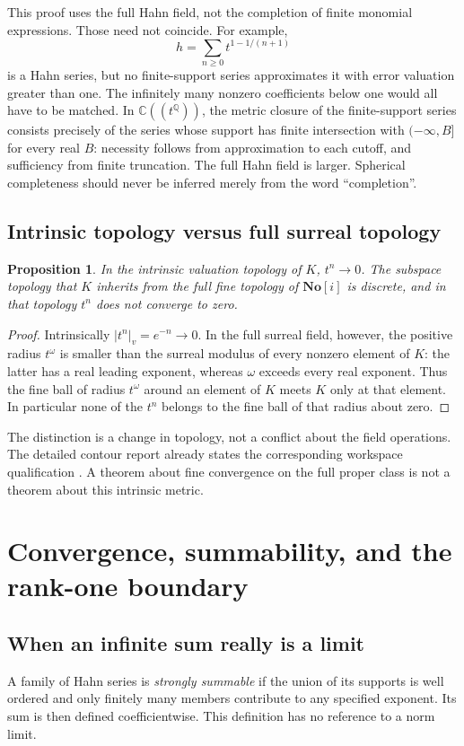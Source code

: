 \documentclass[11pt,a4paper]{article}
\numberwithin{equation}{section}
\newtheorem{proposition}[theorem]{Proposition}
\theoremstyle{definition}
\theoremstyle{remark}
\newcommand{\No}{\mathbf{No}}
\newcommand{\C}{\mathbb C}
\newcommand{\Q}{\mathbb Q}
\newcommand{\vabs}[1]{\lvert#1\rvert_v}
\begin{document}
This proof uses the full Hahn field, not the completion of finite monomial
expressions. Those need not coincide. For example,
\[
 h=\sum_{n\ge0}t^{1-1/(n+1)}
\]
is a Hahn series, but no finite-support series approximates it with error
valuation greater than one. The infinitely many nonzero coefficients below one
would all have to be matched. In $\C((t^\Q))$, the metric closure of the
finite-support series consists precisely of the series whose support has finite
intersection with $(-\infty,B]$ for every real $B$: necessity follows from
approximation to each cutoff, and sufficiency from finite truncation. The full
Hahn field is larger. Spherical completeness should never be inferred merely
from the word ``completion''.

\subsection{Intrinsic topology versus full surreal topology}
\begin{proposition}\label{prop:topologies}
In the intrinsic valuation topology of $K$, $t^n\to0$. The subspace topology
that $K$ inherits from the full fine topology of $\No[i]$ is discrete, and in
that topology $t^n$ does not converge to zero.
\end{proposition}
\begin{proof}
Intrinsically $\vabs{t^n}=e^{-n}\to0$. In the full surreal field, however,
the positive radius $t^\omega$ is smaller than the surreal modulus of every
nonzero element of $K$: the latter has a real leading exponent, whereas
$\omega$ exceeds every real exponent. Thus the fine ball of radius $t^\omega$
around an element of $K$ meets $K$ only at that element. In particular none of
the $t^n$ belongs to the fine ball of that radius about zero.
\end{proof}

The distinction is a change in topology, not a conflict about the field
operations. The detailed contour report already states the corresponding
workspace qualification \cite{RepoContours}. A theorem about fine convergence
on the full proper class is not a theorem about this intrinsic metric.

\section{Convergence, summability, and the rank-one boundary}
\label{sec:convergence}

\subsection{When an infinite sum really is a limit}
A family of Hahn series is \emph{strongly summable} if the union of its supports
is well ordered and only finitely many members contribute to any specified
exponent. Its sum is then defined coefficientwise. This definition has no
reference to a norm limit.
\end{document}
